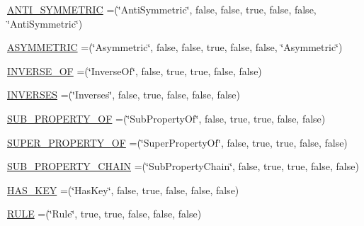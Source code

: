 \begin{DoxyCompactItemize}
\item 
\hyperlink{enumorg_1_1coode_1_1owlapi_1_1manchesterowlsyntax_1_1_manchester_o_w_l_syntax_a861ce3ff78fb371b032ae8c5133b3486}{A\-N\-T\-I\-\_\-\-S\-Y\-M\-M\-E\-T\-R\-I\-C} =(\char`\"{}Anti\-Symmetric\char`\"{}, false, false, true, false, false, \char`\"{}Anti\-Symmetric\char`\"{})
\item 
\hyperlink{enumorg_1_1coode_1_1owlapi_1_1manchesterowlsyntax_1_1_manchester_o_w_l_syntax_aa3fda64ec6c99a5854d5d5c4e2f1e364}{A\-S\-Y\-M\-M\-E\-T\-R\-I\-C} =(\char`\"{}Asymmetric\char`\"{}, false, false, true, false, false, \char`\"{}Asymmetric\char`\"{})
\item 
\hyperlink{enumorg_1_1coode_1_1owlapi_1_1manchesterowlsyntax_1_1_manchester_o_w_l_syntax_a803f0e29ba375a0086393ad701e46f66}{I\-N\-V\-E\-R\-S\-E\-\_\-\-O\-F} =(\char`\"{}Inverse\-Of\char`\"{}, false, true, true, false, false)
\item 
\hyperlink{enumorg_1_1coode_1_1owlapi_1_1manchesterowlsyntax_1_1_manchester_o_w_l_syntax_a215a2b8921094846e3c12b09c4db323f}{I\-N\-V\-E\-R\-S\-E\-S} =(\char`\"{}Inverses\char`\"{}, false, true, false, false, false)
\item 
\hyperlink{enumorg_1_1coode_1_1owlapi_1_1manchesterowlsyntax_1_1_manchester_o_w_l_syntax_a8f7faa57209b40a5e64f13f3a4491797}{S\-U\-B\-\_\-\-P\-R\-O\-P\-E\-R\-T\-Y\-\_\-\-O\-F} =(\char`\"{}Sub\-Property\-Of\char`\"{}, false, true, true, false, false)
\item 
\hyperlink{enumorg_1_1coode_1_1owlapi_1_1manchesterowlsyntax_1_1_manchester_o_w_l_syntax_a7aba40e045c517140ea06f0c46bdf9c6}{S\-U\-P\-E\-R\-\_\-\-P\-R\-O\-P\-E\-R\-T\-Y\-\_\-\-O\-F} =(\char`\"{}Super\-Property\-Of\char`\"{}, false, true, true, false, false)
\item 
\hyperlink{enumorg_1_1coode_1_1owlapi_1_1manchesterowlsyntax_1_1_manchester_o_w_l_syntax_ab09717450345c601947fb2f5dbc36bcd}{S\-U\-B\-\_\-\-P\-R\-O\-P\-E\-R\-T\-Y\-\_\-\-C\-H\-A\-I\-N} =(\char`\"{}Sub\-Property\-Chain\char`\"{}, false, true, true, false, false)
\item 
\hyperlink{enumorg_1_1coode_1_1owlapi_1_1manchesterowlsyntax_1_1_manchester_o_w_l_syntax_a95e7781b5d81760057dc518d8f54aa62}{H\-A\-S\-\_\-\-K\-E\-Y} =(\char`\"{}Has\-Key\char`\"{}, false, true, false, false, false)
\item 
\hyperlink{enumorg_1_1coode_1_1owlapi_1_1manchesterowlsyntax_1_1_manchester_o_w_l_syntax_ad642b2772d9052a08d52289d775b4534}{R\-U\-L\-E} =(\char`\"{}Rule\char`\"{}, true, true, false, false, false)
\end{DoxyCompactItemize}
